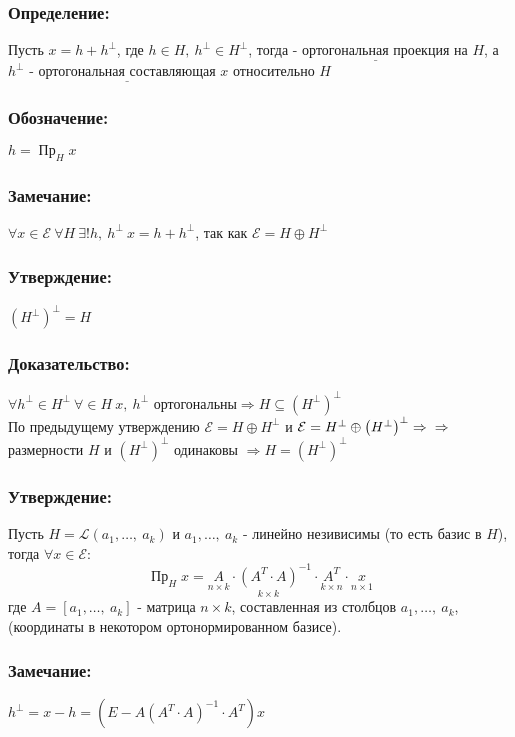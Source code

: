 \documentclass[12pt, letterpaper, twoside]{article}
\newcommand{\Underl}[1]{$\underline{\text{#1}}$}
\begin{document}
    \subsubsection*{Определение:}
    Пусть $x = h + h^{\bot}$, где $h\in H,\ h^{\bot} \in H^{\bot}$, тогда - \Underl{ортогональная проекция} на $H$, а $h^{\bot}$ - \Underl{ортогональная составляющая} $x$ относительно $H$
    \subsubsection*{Обозначение:}
    $h = \operatorname{\text{Пр}}_H x$
    \subsubsection*{Замечание:}
    $\forall x\in \mathcal{E}\ \forall H\ \exists! h,\ h^{\bot}\ x = h + h^{\bot}$, так как $\mathcal{E} = H\oplus H^{\bot}$
    \subsubsection*{Утверждение:}
    $\left( H^{\bot}\right)^{\bot} = H$
    \subsubsection*{Доказательство:}
    $\forall h^{\bot}\in H^{\bot}\ \forall \in H\ x,\ h^{\bot}$ ортогональны$\Rightarrow H\subseteq \left(H^{\bot}\right)^{\bot}$\\
    По предыдущему утверждению $\mathcal{E} = H\oplus H^{\bot}$ и $\mathcal{E} = H^{\bot}\oplus \left(H^{\bot}\right)^{\bot}\Rightarrow\\
    \Rightarrow$ размерности $H$ и $\left( H^{\bot} \right)^{\bot}$ одинаковы $\Rightarrow H = \left( H^{\bot} \right)^{\bot}$
    \subsubsection*{Утверждение:}
    Пусть $H = \mathcal{L}(a_1,\dots,\ a_k)$ и $a_1,\dots,\ a_k$ - линейно незивисимы (то есть базис в $H$), тогда $\forall x\in \mathcal{E}$:
    \[\operatorname{\text{Пр}}_H x = \underset{n\times k}{A}\cdot \underset{k\times k}{\left(A^T\cdot A\right)}^{-1} \cdot \underset{k\times n}{A^T}\cdot \underset{n\times 1}{x}\]
    где $A = [a_1,\dots,\ a_k]$ - матрица $n\times k$, составленная из столбцов $a_1,\dots,\ a_k$, (координаты в некотором ортонормированном базисе).
    \subsubsection*{Замечание:}
    $h^{\bot} = x - h =  (E - A(A^T\cdot A)^{-1}\cdot A^T)x$
\end{document}

